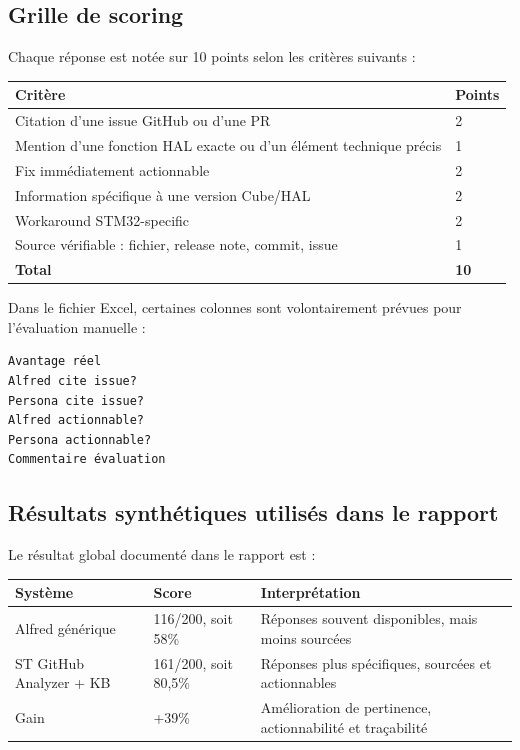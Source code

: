 \documentclass[11pt,a4paper]{article}
\begin{document}
\subsection{Grille de scoring}

Chaque réponse est notée sur 10 points selon les critères suivants :

\begin{longtable}{p{8cm}p{3cm}}
\toprule
\textbf{Critère} & \textbf{Points} \\
\midrule
Citation d'une issue GitHub ou d'une PR & 2 \\
Mention d'une fonction HAL exacte ou d'un élément technique précis & 1 \\
Fix immédiatement actionnable & 2 \\
Information spécifique à une version Cube/HAL & 2 \\
Workaround STM32-specific & 2 \\
Source vérifiable : fichier, release note, commit, issue & 1 \\
\midrule
\textbf{Total} & \textbf{10} \\
\bottomrule
\end{longtable}

Dans le fichier Excel, certaines colonnes sont volontairement prévues pour l'évaluation manuelle :

\begin{verbatim}
Avantage réel
Alfred cite issue?
Persona cite issue?
Alfred actionnable?
Persona actionnable?
Commentaire évaluation
\end{verbatim}

\subsection{Résultats synthétiques utilisés dans le rapport}

Le résultat global documenté dans le rapport est :

\begin{longtable}{p{5cm}p{4cm}p{4cm}}
\toprule
\textbf{Système} & \textbf{Score} & \textbf{Interprétation} \\
\midrule
Alfred générique & 116/200, soit 58\% & Réponses souvent disponibles, mais moins sourcées \\
ST GitHub Analyzer + KB & 161/200, soit 80,5\% & Réponses plus spécifiques, sourcées et actionnables \\
\midrule
Gain & +39\% & Amélioration de pertinence, actionnabilité et traçabilité \\
\bottomrule
\end{longtable}
\end{document}
